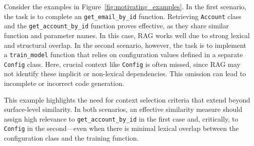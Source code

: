 \documentclass[10pt,conference]{IEEEtran}
\newcommand{\todoc}[2]{{\textcolor{#1}{\textbf{[#2]}}}}
\newcommand{\shi}[1]{\todoc{orange}{Shi: #1}}
\newcommand{\approach}{{LongCodeZip}\xspace} %
\begin{document}

Consider the examples in Figure~\ref{fig:motivating_examples}. In the first scenario, the task is to complete an \texttt{get\_email\_by\_id} function. Retrieving \texttt{Account} class and the \texttt{get\_account\_by\_id} function proves effective, as they share similar function and parameter names. In this case, RAG works well due to strong lexical and structural overlap. 
In the second scenario, however, the task is to implement a \texttt{train\_model} function that relies on configuration values defined in a separate \texttt{Config} class. Here, crucial context like \texttt{Config} is often missed, since RAG may not identify these implicit or non-lexical dependencies. This omission can lead to incomplete or incorrect code generation.


This example highlights the need for context selection criteria that extend beyond surface-level similarity. In both scenarios, an effective similarity measure should assign high relevance to \texttt{get\_account\_by\_id} in the first case and, critically, to \texttt{Config} in the second—even when there is minimal lexical overlap between the configuration class and the training function.
\end{document}
